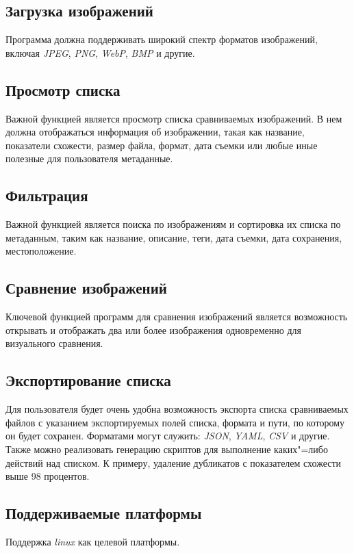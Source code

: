 \documentclass[variant=courcework]{bsuir}
\begin{document}
\subsection{Загрузка изображений}
Программа должна поддерживать широкий спектр форматов изображений, включая
\textit{JPEG}, \textit{PNG}, \textit{WebP}, \textit{BMP} и другие.

\subsection{Просмотр списка}
Важной функцией является просмотр списка сравниваемых изображений. В нем должна
отображаться информация об изображении, такая как название, показатели схожести,
размер файла, формат, дата съемки или любые иные полезные для пользователя
метаданные.

\subsection{Фильтрация}
Важной функцией является поиска по изображениям и сортировка их списка по
метаданным, таким как название, описание, теги, дата съемки, дата сохранения,
местоположение.

\subsection{Сравнение изображений}
Ключевой функцией программ для сравнения изображений является возможность
открывать и отображать два или более изображения одновременно для визуального
сравнения.

\subsection{Экспортирование списка}
Для пользователя будет очень удобна возможность экспорта списка сравниваемых
файлов с указанием экспортируемых полей списка, формата и пути, по которому он
будет сохранен. Форматами могут служить: \textit{JSON}, \textit{YAML},
\textit{CSV} и другие. Также можно реализовать генерацию скриптов для выполнение
каких"=либо действий над списком. К примеру, удаление дубликатов с показателем
схожести выше 98 процентов.

\subsection{Поддерживаемые платформы}
Поддержка \textit{linux} как целевой платформы.\\
\end{document}
